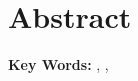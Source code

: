 \thispagestyle{plain}
\chapter*{Abstract}

\lipsum[1-3]

\textbf{Key Words:} \lipsum[4][2], \lipsum[4][7], \lipsum[4][9]

